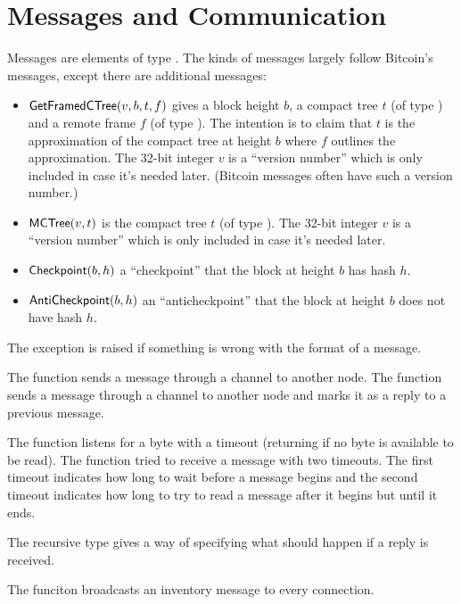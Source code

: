 \section{Messages and Communication}

Messages are elements of type {}.
The kinds of messages largely follow Bitcoin's messages, except there
are additional messages:
\begin{itemize}
\item ${\constr{GetFramedCTree}}(v,b,t,f)$
gives a block height $b$, a compact tree $t$ (of type {})
and a remote frame $f$ (of type {}).
The intention is to claim that $t$ is the approximation of the compact tree at height $b$
where $f$ outlines the approximation.
The 32-bit integer $v$ is a ``version number'' which is only included in case it's needed later.
(Bitcoin messages often have such a version number.)
\item ${\constr{MCTree}}(v,t)$ is the compact tree $t$ (of type {}).
The 32-bit integer $v$ is a ``version number'' which is only included in case it's needed later.
\item ${\constr{Checkpoint}}(b,h)$ a ``checkpoint'' that the block at height $b$ has hash $h$.
\item ${\constr{AntiCheckpoint}}(b,h)$ an ``anticheckpoint'' that the block at height $b$ does not have hash $h$.
\end{itemize}

The exception {} is raised if something is wrong with the format of a message.

The function {} sends a message through a channel to another node.
The function {} sends a message through a channel to another node
and marks it as a reply to a previous message.

The function {} listens for a byte with a timeout (returning
{} if no byte is available to be read).
The function {} tried to receive a message with two timeouts.
The first timeout indicates how long to wait before a message begins
and the second timeout indicates how long to try to read a message after
it begins but until it ends.

The recursive {} type gives a way of specifying
what should happen if a reply is received.

The funciton {} broadcasts an inventory message to every connection.

